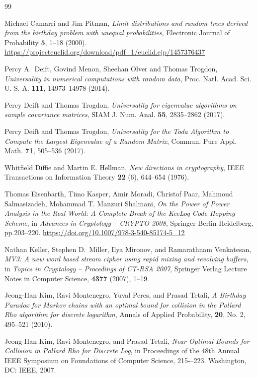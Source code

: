\documentclass{llncs}
\numberwithin{equation}{section}
\renewcommand\({\left(}
\renewcommand\){\right)}
\begin{document}
\begin{thebibliography}{99}

 Michael Camarri and Jim Pitman, {\it Limit distributions and random trees
derived from the birthday problem
with unequal probabilities}, Electronic Journal of Probability {\bf 5}, 1--18 (2000).
\newline\url{https://projecteuclid.org/download/pdf_1/euclid.ejp/1457376437}

 Percy A.~Deift, Govind Menon, Sheehan Olver and Thomas Trogdon, {\it Universality in numerical computations with random data}, Proc. Natl. Acad. Sci. U. S. A. {\bf 111}, 14973--14978 (2014).

 Percy Deift and Thomas Trogdon, {\it Universality for eigenvalue algorithms on sample covariance matrices}, SIAM J. Num. Anal. {\bf 55}, 2835--2862 (2017).


 Percy Deift and Thomas Trogdon, {\it Universality for the Toda Algorithm to Compute the Largest Eigenvalue of a Random Matrix}, Commun. Pure Appl. Math. {\bf 71}, 505--536 (2017).

 Whitfield Diffie and Martin E. Hellman, {\it New directions in cryptography}, IEEE Transactions on Information Theory {\bf 22} (6), 644--654 (1976).


Thomas Eisenbarth, Timo Kasper, Amir Moradi, Christof Paar, Mahmoud Salmasizadeh, Mohammad T. Manzuri Shalmani, {\it On the Power of Power Analysis in the Real World: A Complete Break of the KeeLoq Code Hopping Scheme}, in {\it Advances in Cryptology -- CRYPTO 2008}, Springer Berlin Heidelberg, pp.203--220.
 \url{https://doi.org/10.1007/978-3-540-85174-5_12}



 Nathan Keller, Stephen D.~Miller, Ilya Mironov, and Ramarathnam Venkatesan, {\it MV3: A new word based stream cipher using
rapid mixing and revolving buffers}, in {\it Topics in Cryptology -- Procedings of CT-RSA 2007}, Springer Verlag Lecture Notes in Computer Science, {\bf 4377} (2007),   1--19.


 Jeong-Han Kim, Ravi Montenegro, Yuval Peres, and Prasad Tetali, {\it A Birthday Paradox for Markov chains with an optimal bound for collision in the Pollard Rho algorithm for discrete logarithm},  	Annals of Applied Probability, {\bf 20}, No. 2, 495--521 (2010).

      Jeong-Han Kim, Ravi Montenegro, and Prasad Tetali, {\it Near Optimal Bounds for Collision in Pollard Rho
for Discrete Log}, in
Proceedings of the 48th Annual IEEE Symposium on Foundations of
Computer Science,  215-–223. Washington, DC: IEEE, 2007.


\end{thebibliography}
\end{document}
